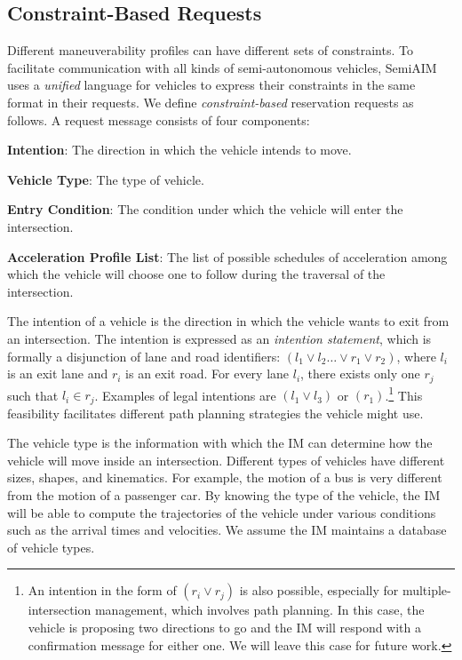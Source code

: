 \subsection{Constraint-Based Requests}

Different maneuverability profiles can have different sets of
constraints.  To facilitate communication with all kinds of
semi-autonomous vehicles, SemiAIM uses a \emph{unified}
language for vehicles to express their constraints in the same format
in their requests.  We define \emph{constraint-based} reservation
requests as follows.  A request message consists of four components:
\begin{compactenum}
\item{\bf Intention}: The direction in which the vehicle intends to
  move.
\item{\bf Vehicle Type}: The type of vehicle.
\item{\bf Entry Condition}: The condition under which the vehicle
  will enter the intersection.
\item{\bf Acceleration Profile List}: The list of possible schedules
  of acceleration among which the vehicle will choose one to follow
  during the traversal of the intersection.
\end{compactenum}
The intention of a vehicle is the direction in which the vehicle wants
to exit from an intersection.  The intention is expressed as an
\emph{intention statement}, which is formally a disjunction of lane
and road identifiers: $(l_1 \vee l_2 \ldots \vee r_1 \vee r_2)$, where
$l_i$ is an exit lane and $r_i$ is an exit road. For every lane $l_i$,
there exists only one $r_j$ such that $l_i \in r_j$. 
Examples of legal intentions are $(l_1 \vee l_3)$ or
$(r_1)$.\footnote{An intention in the form of $(r_i \vee r_j)$ is also possible,
especially for multiple-intersection management, which involves path
planning. In this case, the vehicle is proposing two directions to go
and the IM will respond with a confirmation message for either one. We
will leave this case for future work.}
This feasibility facilitates different path planning strategies the
vehicle might use.

The vehicle type is the information with which the IM can
determine how the vehicle will move inside an intersection.  Different
types of vehicles have different sizes, shapes, and kinematics.  For
example, the motion of a bus is very different from the motion of a
passenger car.  By knowing the type of the vehicle, the IM will be
able to compute the trajectories of the vehicle under various conditions
such as the arrival times and velocities. We assume the IM maintains
a database of vehicle types.

